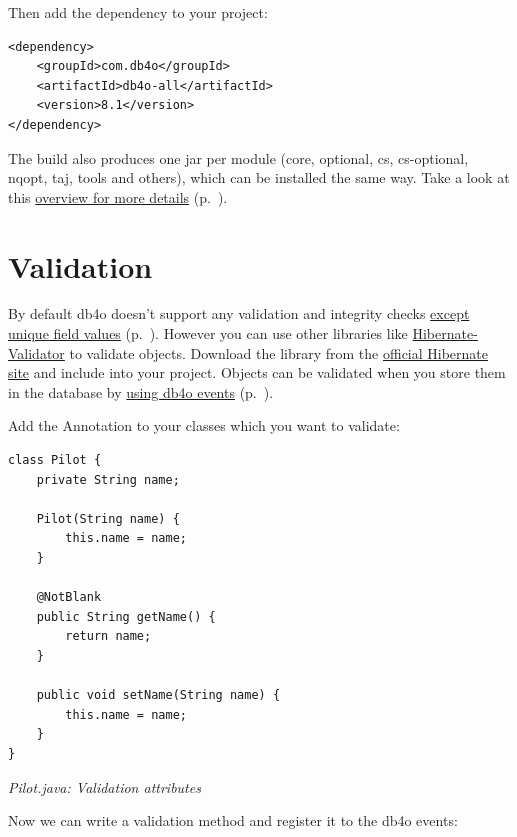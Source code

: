Then add the dependency to your project:

\begin{lstlisting}
<dependency>
    <groupId>com.db4o</groupId>
    <artifactId>db4o-all</artifactId>
    <version>8.1</version>
</dependency>
\end{lstlisting}

The build also produces one jar per module (core, optional, cs, cs-optional, nqopt, taj, tools and others), which can be installed the same way. Take a look at this \hyperref[ref:dependency-overview]{overview for more details} (p.~\pageref{ref:dependency-overview}).

\section{Validation}
\label{ref:platform-specific-issues-validation}

By default db4o doesn't support any validation and integrity checks \hyperref[ref:advanced-topics-unique-constraints]{except unique field values} (p.~\pageref{ref:advanced-topics-unique-constraints}). However you can use other libraries like \href{https://hibernate.org/validator/}{Hibernate-Validator} to validate objects. Download the library from the \href{https://hibernate.org/validator/}{official Hibernate site} and include into your project. Objects can be validated when you store them in the database by \hyperref[ref:advanced-topics-callbacks]{using db4o events} (p.~\pageref{ref:advanced-topics-callbacks}).

Add the Annotation to your classes which you want to validate:

\begin{lstlisting}
class Pilot {
    private String name;

    Pilot(String name) {
        this.name = name;
    }

    @NotBlank
    public String getName() {
        return name;
    }

    public void setName(String name) {
        this.name = name;
    }
}
\end{lstlisting}

{\small\itshape Pilot.java: Validation attributes\par}
\medskip

Now we can write a validation method and register it to the db4o events:

